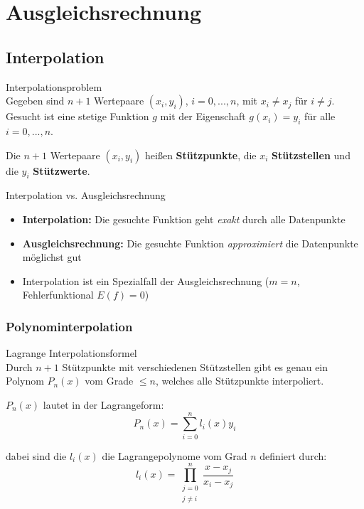 \section{Ausgleichsrechnung}

\subsection{Interpolation}

\begin{definition}{Interpolationsproblem}\\
Gegeben sind $n+1$ Wertepaare $(x_i, y_i)$, $i = 0, ..., n$, mit $x_i \neq x_j$ für $i \neq j$. Gesucht ist eine stetige Funktion $g$ mit der Eigenschaft $g(x_i) = y_i$ für alle $i = 0, ..., n$.

Die $n+1$ Wertepaare $(x_i, y_i)$ heißen \textbf{Stützpunkte}, die $x_i$ \textbf{Stützstellen} und die $y_i$ \textbf{Stützwerte}.
\end{definition}

\begin{concept}{Interpolation vs. Ausgleichsrechnung}\\
\begin{itemize}
    \item \textbf{Interpolation:} Die gesuchte Funktion geht \emph{exakt} durch alle Datenpunkte
    \item \textbf{Ausgleichsrechnung:} Die gesuchte Funktion \emph{approximiert} die Datenpunkte möglichst gut
    \item Interpolation ist ein Spezialfall der Ausgleichsrechnung ($m = n$, Fehlerfunktional $E(f) = 0$)
\end{itemize}
\end{concept}

\subsubsection{Polynominterpolation}

\begin{theorem}{Lagrange Interpolationsformel}\\
Durch $n+1$ Stützpunkte mit verschiedenen Stützstellen gibt es genau ein Polynom $P_n(x)$ vom Grade $\leq n$, welches alle Stützpunkte interpoliert.

$P_n(x)$ lautet in der Lagrangeform:
$$P_n(x) = \sum_{i=0}^{n} l_i(x) y_i$$

dabei sind die $l_i(x)$ die Lagrangepolynome vom Grad $n$ definiert durch:
$$l_i(x) = \prod_{\substack{j=0 \\ j \neq i}}^{n} \frac{x - x_j}{x_i - x_j}$$
\end{theorem}

